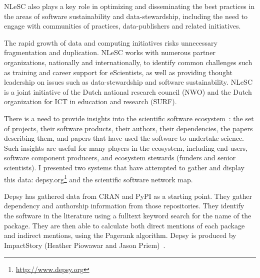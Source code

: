 \documentclass[a4paper,UKenglish]{dagrep}
\begin{document}
NLeSC also plays a key role in optimizing and disseminating the best
practices in the areas of software sustainability and
data-stewardship, including the need to engage with communities of
practices, data-publishers and related initiatives.

The rapid growth of data and computing initiatives risks unnecessary
fragmentation and duplication. NLeSC works with numerous partner
organizations, nationally and internationally, to identify common
challenges such as training and career support for eScientists, as
well as providing thought leadership on issues such as
data-stewardship and software sustainability. NLeSC is a joint
initiative of the Dutch national research council (NWO) and the Dutch
organization for ICT in education and research (SURF).





There is a need to provide insights into the scientific software ecosystem~\cite{bogart_mapping_2015}: the set of projects, their software products, their authors, their dependencies, the papers describing them, and papers that have used the software to undertake science.  Such insights are useful for many players in the ecosystem, including end-users, software component producers, and ecosystem stewards (funders and senior scientists). I presented two systems that have attempted to gather and display this data: depsy.org\footnote{\url{http://www.depsy.org}} and the scientific software network map.

Depsy has gathered data from CRAN and PyPI as a starting point. They gather dependency and authorship information from those repositories. They identify the software in the literature using a fulltext keyword search for the name of the package. They are then able to calculate both direct mentions of each package and indirect mentions, using the Pagerank algorithm.  Depsy is produced by ImpactStory (Heather Piowawar and Jason Priem)~\cite{singh_chawla_unsung_2016}.
\end{document}
